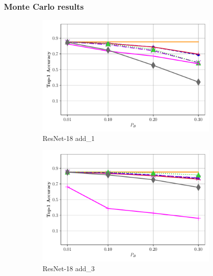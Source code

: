 \documentclass[aspectratio=169]{beamer}
\begin{document}
\begin{frame}
	\frametitle{Monte Carlo results}
	
	\begin{figure}[H]
		\centering
		\begin{subfigure}{.275\linewidth}
			\centering
			\includegraphics[width = \linewidth]{lp_vcip_rpp_8_top1_resnet18_add_1.pdf}
			\vspace*{-8mm} \caption{ResNet-18 add\_1}
		\end{subfigure}%
		\hfill
		\begin{subfigure}{.275\textwidth}
			\centering
			\includegraphics[width = \textwidth]{lp_vcip_rpp_4_top1_resnet18_add_3.pdf}
			\vspace*{-8mm} \caption{ResNet-18 add\_3}
		\end{subfigure}%
		\hfill
		\begin{subfigure}{.275\textwidth}
			\centering

\end{subfigure}
\end{figure}
\end{frame}
\end{document}

